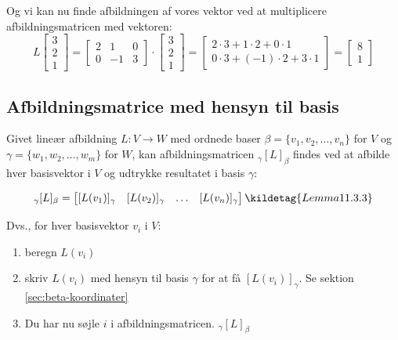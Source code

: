 {Og vi kan nu finde afbildningen af vores vektor ved at multiplicere afbildningsmatricen med vektoren:
\[
    L
    \begin{bmatrix}
        3 \\
        2 \\
        1
    \end{bmatrix} 
    =
    \begin{bmatrix}
        2 & 1 & 0 \\
        0 & -1 & 3
    \end{bmatrix} \cdot
    \begin{bmatrix}
        3 \\
        2 \\
        1
    \end{bmatrix} =
    \begin{bmatrix}
        2 \cdot 3 + 1 \cdot 2 + 0 \cdot 1 \\
        0 \cdot 3 + (-1) \cdot 2 + 3 \cdot 1
    \end{bmatrix} =
    \begin{bmatrix}
        8 \\
        1
    \end{bmatrix}
\]
}

\subsection{Afbildningsmatrice med hensyn til basis}
Givet lineær afbildning \( L : V \rightarrow W \) med ordnede baser \( \beta = \{ v_1, v_2, \ldots, v_n \} \) for \( V \) og \( \gamma = \{ w_1, w_2, \ldots, w_m \} \) for \( W \), kan afbildningsmatricen \( _\gamma [L]_\beta \) findes ved at afbilde hver basisvektor i \( V \) og udtrykke resultatet i basis \( \gamma \):

\[
_\gamma [L]_\beta = \begin{bmatrix}
    [L(v_1)]_\gamma & [L(v_2)]_\gamma & \ldots & [L(v_n)]_\gamma
\end{bmatrix}
\kildetag{Lemma 11.3.3}
\]

Dvs., for hver basisvektor \( v_i \) i \( V \):
\begin{enumerate}
    \item beregn \( L(v_i) \)
    \item skriv \( L(v_i) \) med hensyn til basis \( \gamma \) for at få \( [L(v_i)]_\gamma \). Se sektion \ref{sec:beta-koordinater}
    \item Du har nu søjle $i$ i afbildningsmatricen. $_\gamma [L]_\beta$
\end{enumerate}

